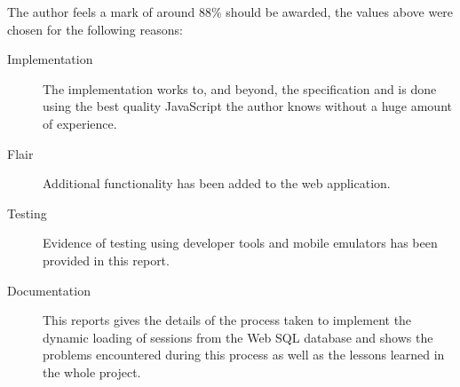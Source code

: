 \documentclass[11pt, a4paper]{article}
\begin{document}
The author feels a mark of around 88\% should be awarded, the values above were
chosen for the following reasons:

\begin{description}
\item[Implementation] The implementation works to, and beyond, the
specification and is done using the best quality JavaScript the author knows
without a huge amount of experience.
\item[Flair] Additional functionality has been added to the web application.
\item[Testing] Evidence of testing using developer tools and mobile emulators
has been provided in this report.
\item[Documentation] This reports gives the details of the process taken to
implement the dynamic loading of sessions from the Web SQL database and shows
the problems encountered during this process as well as the lessons learned in
the whole project.
\end{description}


\newpage


\end{document}
